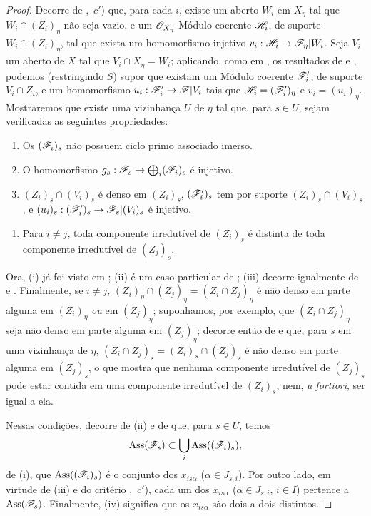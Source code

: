 \begin{proof}
\label{IV.9.8.3-proof}
Decorre de ,~$c'$) que, para cada $i$, existe um aberto $W_i$ em $X_\eta$ tal que $W_i\cap(Z_i)_\eta$ não seja vazio, e um $\mathscr{O}_{X_\eta}$-Módulo coerente $\mathscr{H}_i$, de suporte $W_i\cap(Z_i)_\eta$, tal que exista um homomorfismo injetivo $v_i:\sh{H}_i\to\sh{F}_\eta|W_i$.
Seja $V_i$ um aberto de $X$ tal que $V_i\cap X_\eta=W_i$; aplicando, como em , os resultados de  e , podemos (restringindo $S$) supor que existam um Módulo coerente $\mathscr{F}'_i$, de suporte $V_i\cap Z_i$, e um homomorfismo $u_i:\sh{F}'_i\to\sh{F}|V_i$ tais que $\mathscr{H}_i=(\mathscr{F}'_i)_\eta$ e $v_i=(u_i)_\eta$.
Mostraremos que existe uma vizinhança $U$ de $\eta$ tal que, para $s\in U$, sejam verificadas as seguintes propriedades:
\begin{enumerate}[label=(\roman*)]
  \item Os $(\mathscr{F}_i)_s$ não possuem ciclo primo associado imerso.
  \item O homomorfismo $g_s:\sh{F}_s\to\bigoplus_i(\sh{F}_i)_s$ é injetivo.
  \item $(Z_i)_s\cap(V_i)_s$ é denso em $(Z_i)_s$, $(\mathscr{F}'_i)_s$ tem por suporte $(Z_i)_s\cap(V_i)_s$, e $(u_i)_s:(\sh{F}'_i)_s\to\sh{F}_s|(V_i)_s$ é injetivo.
\end{enumerate}

\begin{enumerate}[label=(\roman*)]
  \item[(iv)] Para $i\neq j$, toda componente irredutível de $(Z_i)_s$ é distinta de toda componente irredutível de $(Z_j)_s$.
\end{enumerate}

Ora, (i) já foi visto em ; (ii) é um caso particular de ; (iii) decorre igualmente de  e .
Finalmente, se $i\neq j$, $(Z_i)_\eta\cap(Z_j)_\eta=(Z_i\cap Z_j)_\eta$ é não denso em parte alguma em $(Z_i)_\eta$ \emph{ou} em $(Z_j)_\eta$; suponhamos, por exemplo, que $(Z_i\cap Z_j)_\eta$ seja não denso em parte alguma em $(Z_j)_\eta$; decorre então de  e  que, para $s$ em uma vizinhança de $\eta$, $(Z_i\cap Z_j)_s=(Z_i)_s\cap(Z_j)_s$ é não denso em parte alguma em $(Z_j)_s$, o que mostra que nenhuma componente irredutível de $(Z_j)_s$ pode estar contida em uma componente irredutível de $(Z_i)_s$, nem, \emph{a fortiori}, ser igual a ela.

Nessas condições, decorre de (ii) e de  que, para $s\in U$, temos
\[
  \operatorname{Ass}(\mathscr{F}_s)\subset\bigcup_i\operatorname{Ass}((\mathscr{F}_i)_s),
\]
de (i), que $\operatorname{Ass}((\mathscr{F}_i)_s)$ é o conjunto dos $x_{is\alpha}$ ($\alpha\in J_{s,i}$).
Por outro lado, em virtude de (iii) e do critério ,~$c'$), cada um dos $x_{is\alpha}$ ($\alpha\in J_{s,i}$, $i\in I$) pertence a $\operatorname{Ass}(\mathscr{F}_s)$.
Finalmente, (iv) significa que os $x_{is\alpha}$ são dois a dois distintos.


\end{proof}
